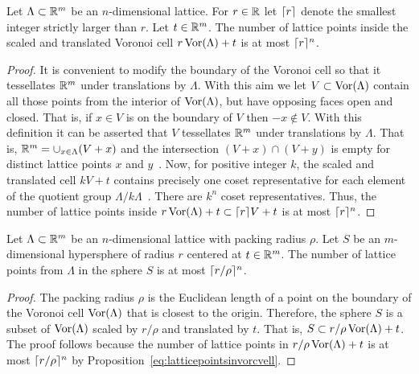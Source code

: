 \documentclass[final,leqno]{siamltex}
\begin{document}
\begin{proposition}\label{eq:latticepointsinvorcvell}
Let $\Lambda \subset {\mathbb R}^{m}$ be an $n$-dimensional lattice.  For $r\in {\mathbb R}$ let $\lceil r \rceil$ denote the smallest integer strictly larger than $r$.  Let $t \in {\mathbb R}^m$.  The number of lattice points inside the scaled and translated Voronoi cell $r \operatorname{Vor}(\Lambda) + t$ is at most $\lceil r \rceil^n$.
\end{proposition}
\begin{proof}
It is convenient to modify the boundary of the Voronoi cell so that it tessellates ${\mathbb R}^m$ under translations by $\Lambda$.  With this aim we let $V \subset \operatorname{Vor}(\Lambda)$ contain all those points from the interior of $\operatorname{Vor}(\Lambda)$, but have opposing faces open and closed.  That is, if $x \in V$ is on the boundary of $V$ then $-x \notin V$.  With this definition it can be asserted that $V$ tessellates ${\mathbb R}^m$ under translations by $\Lambda$.  That is, ${\mathbb R}^{m} = \cup_{x \in \Lambda}(V + x)$ and the intersection $(V + x)\cap(V+y)$ is empty for distinct lattice points $x$ and $y$~\cite[Sec.~2.2]{McKilliam2010thesis}.  Now, for positive integer $k$, the scaled and translated cell $kV + t$ contains precisely one coset representative for each element of the quotient group $\Lambda/k\Lambda$~\cite[Sec.~2.4]{McKilliam2010thesis}.  There are $k^n$ coset representatives.  Thus, the number of lattice points inside $r \operatorname{Vor}(\Lambda) + t \subset \lceil r \rceil V + t$ is at most $\lceil r \rceil^n$.
\end{proof}
 

\begin{proposition}\label{eq:latticepointsinsphere}
Let $\Lambda \subset {\mathbb R}^{m}$ be an $n$-dimensional lattice with packing radius $\rho$.  Let $S$ be an $m$-dimensional hypersphere of radius $r$ centered at $t \in {\mathbb R}^{m}$.  The number of lattice points from $\Lambda$ in the sphere $S$ is at most $\lceil r/\rho \rceil^{n}$. %
 \end{proposition}
 \begin{proof}
The packing radius $\rho$ is the Euclidean length of a point on the boundary of the Voronoi cell $\operatorname{Vor}(\Lambda)$ that is closest to the origin. Therefore, the sphere $S$ is a subset of $\operatorname{Vor}(\Lambda)$ scaled by $r/\rho$ and translated by $t$.  That is, $S \subset r/\rho \operatorname{Vor}(\Lambda) + t$.  The proof follows because the number of lattice points in $r/\rho \operatorname{Vor}(\Lambda) + t$ is at most $\lceil r/\rho \rceil^n$ by Proposition~\ref{eq:latticepointsinvorcvell}.
\end{proof}
 
\end{document}
